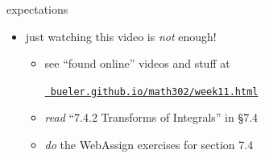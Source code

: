 \documentclass[urlcolor=blue,dvipsnames]{beamer}
\begin{document}
\begin{frame}{expectations}

\begin{itemize}
\item just watching this video is \emph{not} enough!
     \begin{itemize}
     \item see ``found online'' videos and stuff at

     \centerline{\href{https://bueler.github.io/math302/week11.html}{\tt \color{cyan} bueler.github.io/math302/week11.html}}
     \item \emph{read} ``7.4.2 Transforms of Integrals'' in \S7.4
     \item \emph{do} the WebAssign exercises for section 7.4
     \end{itemize}
\end{itemize}
\end{frame}
\end{document}
